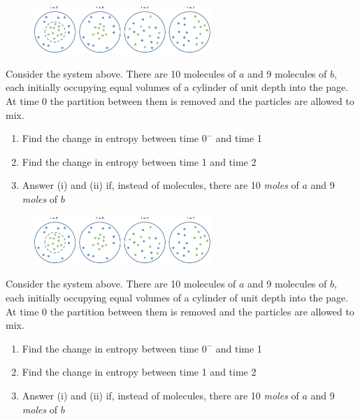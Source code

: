 \documentclass[12pt]{article}
\title{}
\author{}
\date{}
\begin{document}
\thispagestyle{empty}
\begin{figure}[h]\centering\includegraphics[width=0.6\textwidth]{Graphics/entropy_spheres.PNG}\end{figure}
Consider the system above. There are 10 molecules of $a$ and 9 molecules of $b$, each initially occupying equal volumes of a cylinder of unit depth into the page. At time 0 the partition between them is removed and the particles are allowed to mix.
\begin{enumerate}[label=(\roman*)]
\item Find the change in entropy between time $0^-$ and time 1
\item Find the change in entropy between time 1 and time 2
\item Answer (i) and (ii) if, instead of molecules, there are 10 \emph{moles} of $a$ and 9 \emph{moles} of $b$
\end{enumerate}

\begin{figure}[h]\centering\includegraphics[width=0.6\textwidth]{Graphics/entropy_spheres.PNG}\end{figure}
Consider the system above. There are 10 molecules of $a$ and 9 molecules of $b$, each initially occupying equal volumes of a cylinder of unit depth into the page. At time 0 the partition between them is removed and the particles are allowed to mix.
\begin{enumerate}[label=(\roman*)]
\item Find the change in entropy between time $0^-$ and time 1
\item Find the change in entropy between time 1 and time 2
\item Answer (i) and (ii) if, instead of molecules, there are 10 \emph{moles} of $a$ and 9 \emph{moles} of $b$
\end{enumerate}
\end{document}
